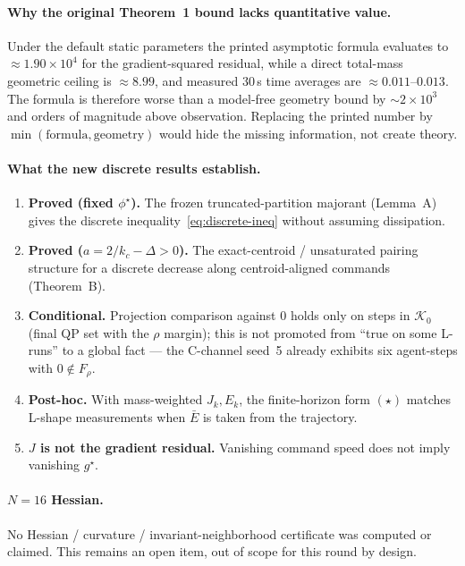 \documentclass[11pt]{article}
\newcommand{\gstar}{g^\star}
\begin{document}
\paragraph{Why the original Theorem~1 bound lacks quantitative value.} Under the
default static parameters the printed asymptotic formula evaluates to
$\approx 1.90\times10^{4}$ for the gradient-squared residual, while a direct
total-mass geometric ceiling is $\approx 8.99$, and measured 30\,s time averages
are $\approx 0.011$--$0.013$. The formula is therefore worse than a model-free
geometry bound by $\sim 2\times10^{3}$ and orders of magnitude above
observation. Replacing the printed number by $\min(\text{formula},\text{geometry})$
would hide the missing information, not create theory.

\paragraph{What the new discrete results establish.}
\begin{enumerate}
\item \textbf{Proved (fixed $\phi^\star$).} The frozen truncated-partition
majorant (Lemma~A) gives the discrete inequality~\eqref{eq:discrete-ineq}
without assuming dissipation.
\item \textbf{Proved ($a=2/k_c-\Delta>0$).} The exact-centroid / unsaturated
pairing structure for a discrete decrease along centroid-aligned commands
(Theorem~B).
\item \textbf{Conditional.} Projection comparison against $0$ holds only on
steps in $\mathcal{K}_0$ (final QP set with the $\rho$ margin); this is not
promoted from ``true on some L-runs'' to a global fact --- the C-channel seed~5
already exhibits six agent-steps with $0\notin F_\rho$.
\item \textbf{Post-hoc.} With mass-weighted $J_k,E_k$, the finite-horizon form
$(\star)$ matches L-shape measurements when $\bar E$ is taken from the
trajectory.
\item \textbf{$J$ is not the gradient residual.} Vanishing command speed does
not imply vanishing $\gstar$.
\end{enumerate}

\paragraph{$N=16$ Hessian.} No Hessian / curvature / invariant-neighborhood
certificate was computed or claimed. This remains an open item, out of scope for
this round by design.
\end{document}
